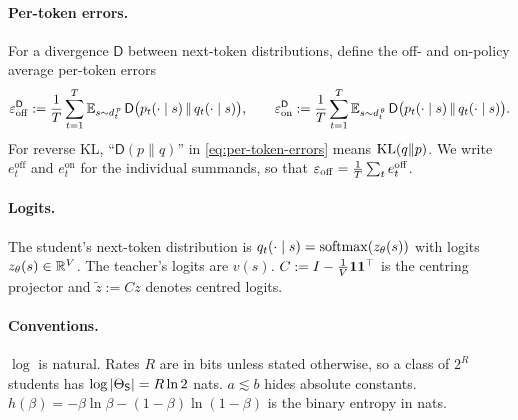 \paragraph{Per-token errors.}
For a divergence $\mathsf D$ between next-token distributions, define the off- and on-policy
average per-token errors
\begin{equation}\label{eq:per-token-errors}
\varepsilon_{\mathrm{off}}^{\mathsf D}:=\frac1T\sum_{t=1}^T \mathbb{E}_{s\sim d^{\,p}_{t}}\,\mathsf D\big(p_t(\cdot\mid s)\,\|\,q_t(\cdot\mid s)\big),
\qquad
\varepsilon_{\mathrm{on}}^{\mathsf D}:=\frac1T\sum_{t=1}^T \mathbb{E}_{s\sim d^{\,\theta}_{t}}\,\mathsf D\big(p_t(\cdot\mid s)\,\|\,q_t(\cdot\mid s)\big).
\end{equation}
For reverse KL, ``$\mathsf D(p\|q)$'' in \eqref{eq:per-token-errors} means $\mathrm{KL}(q\|p)$. We write
$e_t^{\mathrm{off}}$ and $e_t^{\mathrm{on}}$ for the individual summands, so that
$\varepsilon_{\mathrm{off}}=\frac1T\sum_t e_t^{\mathrm{off}}$.

\paragraph{Logits.}
The student's next-token distribution is $q_t(\cdot\mid s)=\operatorname{softmax}(z_\theta(s))$ with logits
$z_\theta(s)\in\mathbb{R}^V$. The teacher's logits are $v(s)$. $C:=I-\frac1V\mathbf{1}\mathbf{1}^\top$ is the centring
projector and $\tilde z:=Cz$ denotes centred logits.

\paragraph{Conventions.}
$\log$ is natural. Rates $R$ are in bits unless stated otherwise, so a class of $2^R$ students has
$\log|\Theta_{\mathsf{S}}|=R\ln 2$ nats. $a\lesssim b$ hides absolute constants. $h(\beta)=-\beta\ln\beta-(1-\beta)\ln(1-\beta)$
is the binary entropy in nats.

